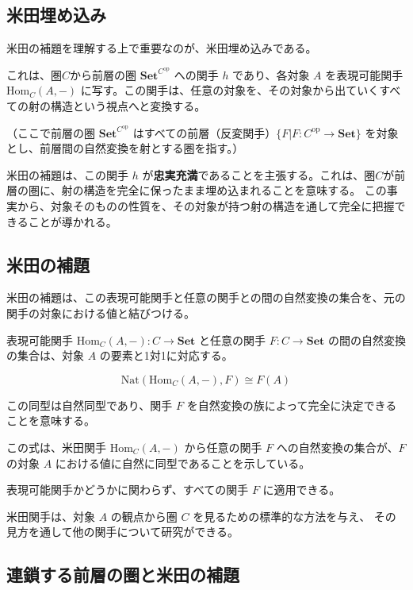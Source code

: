 \documentclass[uplatex,a4j,12pt,dvipdfmx]{jsarticle}
\begin{document}
\subsection{米田埋め込み}

米田の補題を理解する上で重要なのが、米田埋め込みである。

これは、圏$C$から前層の圏 $\mathbf{Set}^{C^{\text{op}}}$ への関手 $h$ であり、各対象 $A$ を表現可能関手 $\mathrm{Hom}_C(A, -)$ に写す。この関手は、任意の対象を、その対象から出ていくすべての射の構造という視点へと変換する。

（ここで前層の圏 $\mathbf{Set}^{C^{\text{op}}}$ はすべての前層（反変関手）$\{ F |F : C^{\text{op}} \to \mathbf{Set} \}$ を対象とし、前層間の自然変換を射とする圏を指す。）

米田の補題は、この関手 $h$ が\textbf{忠実充満}であることを主張する。これは、圏$C$が前層の圏に、射の構造を完全に保ったまま埋め込まれることを意味する。
この事実から、対象そのものの性質を、その対象が持つ射の構造を通して完全に把握できることが導かれる。




\subsection{米田の補題}

米田の補題は、この表現可能関手と任意の関手との間の自然変換の集合を、元の関手の対象における値と結びつける。

表現可能関手 $\mathrm{Hom}_C(A, -): C \to \mathbf{Set}$ と任意の関手 $F: C \to \mathbf{Set}$ の間の自然変換の集合は、対象 $A$ の要素と1対1に対応する。

$$
	\text{Nat}(\mathrm{Hom}_C(A, -), F) \cong F(A)
$$

この同型は自然同型であり、関手 $F$ を自然変換の族によって完全に決定できることを意味する。

この式は、米田関手
$\mathrm{Hom}_C(A, -)$
から任意の関手 $F$ への自然変換の集合が、$F$ の対象 $A$ における値に自然に同型であることを示している。

表現可能関手かどうかに関わらず、すべての関手 $F$ に適用できる。

米田関手は、対象 $A$ の観点から圏 $C$ を見るための標準的な方法を与え、
その見方を通して他の関手について研究ができる。

\subsection{連鎖する前層の圏と米田の補題}
\end{document}

